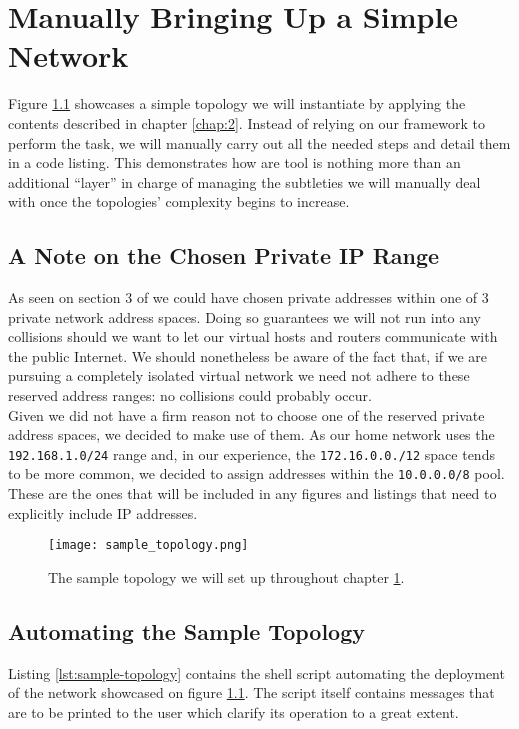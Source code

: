 \chapter{Manually Bringing Up a Simple Network} \label{chap:3}
    Figure \ref{fig:sample-topology} showcases a simple topology we will instantiate by applying the contents described in chapter \ref{chap:2}. Instead of relying on our framework to perform the task, we will manually carry out all the needed steps and detail them in a code listing. This demonstrates how are tool is nothing more than an additional ``layer'' in charge of managing the subtleties we will manually deal with once the topologies' complexity begins to increase.\\

    \section{A Note on the Chosen Private IP Range}
        As seen on section $3$ of \cite{bib:rfc1918} we could have chosen private addresses within one of $3$ private network address spaces. Doing so guarantees we will not run into any collisions should we want to let our virtual hosts and routers communicate with the public Internet. We should nonetheless be aware of the fact that, if we are pursuing a completely isolated virtual network we need not adhere to these reserved address ranges: no collisions could probably occur.\\

        Given we did not have a firm reason not to choose one of the reserved private address spaces, we decided to make use of them. As our home network uses the \texttt{192.168.1.0/24} range and, in our experience, the \texttt{172.16.0.0./12} space tends to be more common, we decided to assign addresses within the \texttt{10.0.0.0/8} pool. These are the ones that will be included in any figures and listings that need to explicitly include IP addresses.\\

    \begin{figure}
        \centering
        \texttt{[image: sample\_topology.png]}
        \caption{The sample topology we will set up throughout chapter \ref{chap:3}.}
        \label{fig:sample-topology}
    \end{figure}

    \section{Automating the Sample Topology}
        Listing \ref{lst:sample-topology} contains the shell script automating the deployment of the network showcased on figure \ref{fig:sample-topology}. The script itself contains messages that are to be printed to the user which clarify its operation to a great extent.\\


